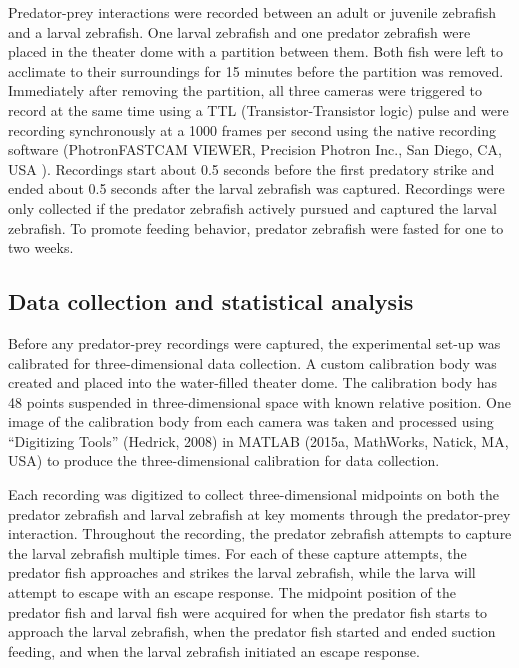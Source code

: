 \documentclass[]{rsos}%
\begin{document}
Predator-prey interactions were recorded between an adult or juvenile zebrafish and a larval zebrafish. One larval zebrafish and one predator zebrafish were placed in the theater dome with a partition between them. Both fish were left to acclimate to their surroundings for 15 minutes before the partition was removed. Immediately after removing the partition, all three cameras were triggered to record at the same time using a TTL (Transistor-Transistor logic) pulse and were recording synchronously at a 1000 frames per second using the native recording software (PhotronFASTCAM VIEWER, Precision Photron Inc., San Diego, CA, USA ). Recordings start about 0.5 seconds before the first predatory strike and ended about 0.5 seconds after the larval zebrafish was captured. Recordings were only collected if the predator zebrafish actively pursued and captured the larval zebrafish. To promote feeding behavior, predator zebrafish were fasted for one to two weeks.

\subsection{Data collection and statistical analysis}
Before any predator-prey recordings were captured, the experimental set-up was calibrated for three-dimensional data collection. A custom calibration body was created  and placed into the water-filled theater dome. The calibration body has 48 points suspended in three-dimensional space with known relative position. One image of the calibration body from each camera was taken and processed using “Digitizing Tools” (Hedrick, 2008) in MATLAB (2015a, MathWorks, Natick, MA, USA) to produce the three-dimensional calibration for data collection.

Each recording was digitized to collect three-dimensional midpoints on both the predator zebrafish and larval zebrafish at key moments through the predator-prey interaction. Throughout the recording, the predator zebrafish attempts to capture the larval zebrafish multiple times. For each of these capture attempts, the predator fish approaches and strikes the larval zebrafish, while the larva will attempt to escape with an escape response. The midpoint position of the predator fish and larval fish were acquired for when the predator fish starts to approach the larval zebrafish, when the predator fish started and ended suction feeding, and when the larval zebrafish initiated an escape response.
\end{document}
